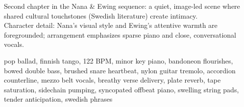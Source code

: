 

\begin{notes}
Second chapter in the Nana \& Ewing sequence: a quiet, image-led scene where shared cultural touchstones (Swedish literature) create intimacy.\\
Character detail: Nana's visual style and Ewing's attentive warmth are foregrounded; arrangement emphasizes sparse piano and close, conversational vocals.
\end{notes}

\begin{style}
pop ballad, finnish tango, 122 BPM, minor key piano, bandoneon flourishes, bowed double bass, brushed snare heartbeat, nylon guitar tremolo, accordion counterline, mezzo belt vocals, breathy verse delivery, plate reverb, tape saturation, sidechain pumping, syncopated offbeat piano, swelling string pads, tender anticipation, swedish phrases
\end{style}

